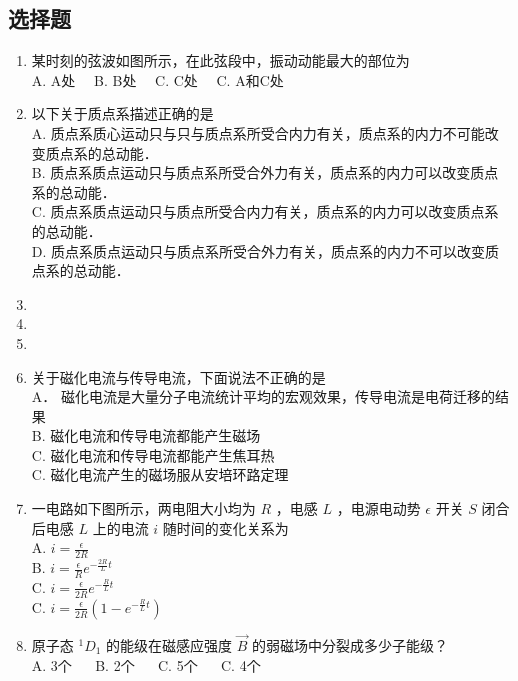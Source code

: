 
\subsection{选择题}
\begin{enumerate}

\item 某时刻的弦波如图所示，在此弦段中，振动动能最大的部位为\\

A. A处$\quad$
B. B处$\quad$
C. C处$\quad$
C. A和C处$\quad$

\item 以下关于质点系描述正确的是\\

A. 质点系质心运动只与只与质点系所受合内力有关，质点系的内力不可能改变质点系的总动能．\\
B. 质点系质点运动只与质点系所受合外力有关，质点系的内力可以改变质点系的总动能．\\
C. 质点系质点运动只与质点所受合内力有关，质点系的内力可以改变质点系的总动能．\\
D. 质点系质点运动只与质点系所受合外力有关，质点系的内力不可以改变质点系的总动能．\\

\item 

\item 

\item 

\item 关于磁化电流与传导电流，下面说法不正确的是\\

A． 磁化电流是大量分子电流统计平均的宏观效果，传导电流是电荷迁移的结果\\
B. 磁化电流和传导电流都能产生磁场\\
C. 磁化电流和传导电流都能产生焦耳热\\
C. 磁化电流产生的磁场服从安培环路定理\\

\item 一电路如下图所示，两电阻大小均为 $R$ ，电感 $L$ ，电源电动势 $\epsilon$ 开关 $S$ 闭合后电感 $L$ 上的电流 $i$ 随时间的变化关系为\\

A. $i = \frac{\epsilon}{2R}$\\
B. $i = \frac{\epsilon}{R}e^{-\frac{2R}{L}t}$\\
C. $i = \frac{\epsilon}{2R}e^{-\frac{R}{L}t}$\\
C. $i = \frac{\epsilon}{2R}(1-e^{-\frac{R}{L}t})$\\

\item 原子态 $^{1}D_{1}$ 的能级在磁感应强度 $\vec{B}$ 的弱磁场中分裂成多少子能级？\\

A. 3个 $\quad$
B. 2个 $\quad$
C. 5个 $\quad$
C. 4个 $\quad$
\end{enumerate}

\subsection{}